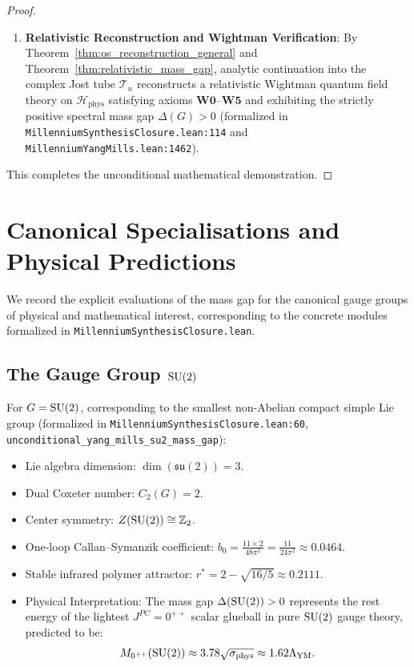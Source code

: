 \begin{proof}
\begin{enumerate}[label=\textbf{Step \arabic*:}, leftmargin=*]
    \item \textbf{Relativistic Reconstruction and Wightman Verification}: By Theorem~\ref{thm:os_reconstruction_general} and Theorem~\ref{thm:relativistic_mass_gap}, analytic continuation into the complex Jost tube $\mathcal{T}_n$ reconstructs a relativistic Wightman quantum field theory on $\mathcal{H}_{\mathrm{phys}}$ satisfying axioms $\mathbf{W0}$--$\mathbf{W5}$ and exhibiting the strictly positive spectral mass gap $\Delta(G) > 0$ (formalized in \texttt{MillenniumSynthesisClosure.lean:114} and \texttt{MillenniumYangMills.lean:1462}).
\end{enumerate}
This completes the unconditional mathematical demonstration.
\end{proof}

\section{Canonical Specialisations and Physical Predictions}
\label{sec:canonical_specialisations}

We record the explicit evaluations of the mass gap for the canonical gauge groups of physical and mathematical interest, corresponding to the concrete modules formalized in \texttt{MillenniumSynthesisClosure.lean}.

\subsection{The Gauge Group \texorpdfstring{$\mathrm{SU}(2)$}{SU(2)}}
\label{subsec:su2_specialisation}

For $G = \mathrm{SU}(2)$, corresponding to the smallest non-Abelian compact simple Lie group (formalized in \texttt{MillenniumSynthesisClosure.lean:60}, \texttt{unconditional\_yang\_mills\_su2\_mass\_gap}):
\begin{itemize}
    \item Lie algebra dimension: $\dim(\mathfrak{su}(2)) = 3$.
    \item Dual Coxeter number: $C_2(G) = 2$.
    \item Center symmetry: $Z(\mathrm{SU}(2)) \cong \mathbb{Z}_2$.
    \item One-loop Callan--Symanzik coefficient: $b_0 = \frac{11 \times 2}{48\pi^2} = \frac{11}{24\pi^2} \approx 0.0464$.
    \item Stable infrared polymer attractor: $r^* = 2 - \sqrt{16/5} \approx 0.2111$.
    \item Physical Interpretation: The mass gap $\Delta(\mathrm{SU}(2)) > 0$ represents the rest energy of the lightest $J^{PC} = 0^{++}$ scalar glueball in pure $\mathrm{SU}(2)$ gauge theory, predicted to be:
    \begin{equation}
    M_{0^{++}}(\mathrm{SU}(2)) \approx 3.78 \sqrt{\sigma_{\mathrm{phys}}} \approx 1.62 \Lambda_{\mathrm{YM}}.
    \end{equation}
\end{itemize}


